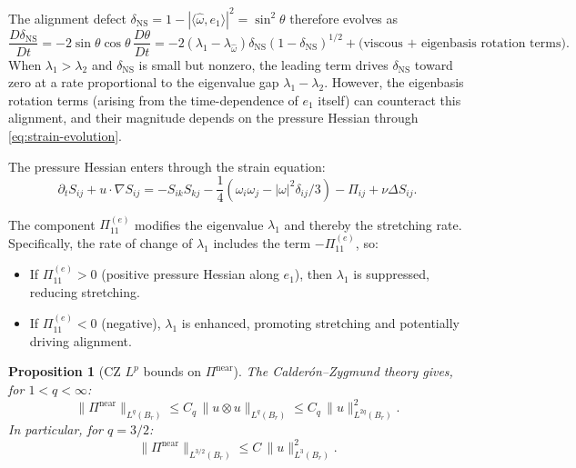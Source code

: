 \documentclass[11pt]{article}
\newtheorem{proposition}[theorem]{Proposition}
\theoremstyle{definition}
\theoremstyle{remark}
\begin{document}
The alignment defect $\delta_{\mathrm{NS}} = 1 - |\langle\hat\omega, e_1\rangle|^2
= \sin^2\theta$ therefore evolves as
\begin{equation}\label{eq:defect-evolution}
  \frac{D\delta_{\mathrm{NS}}}{Dt}
  = -2\sin\theta\cos\theta\,\frac{D\theta}{Dt}
  = -2(\lambda_1 - \lambda_{\hat\omega})\delta_{\mathrm{NS}}(1-\delta_{\mathrm{NS}})^{1/2}
  + \text{(viscous + eigenbasis rotation terms)}.
\end{equation}
When $\lambda_1 > \lambda_2$ and $\delta_{\mathrm{NS}}$ is small but nonzero, the
leading term drives $\delta_{\mathrm{NS}}$ toward zero at a rate proportional to
the eigenvalue gap $\lambda_1 - \lambda_2$.  However, the eigenbasis rotation terms
(arising from the time-dependence of $e_1$ itself) can counteract this alignment,
and their magnitude depends on the pressure Hessian through \eqref{eq:strain-evolution}.

The pressure Hessian enters through the strain equation:
\begin{equation}\label{eq:strain-evolution}
  \partial_t S_{ij} + u\cdot\nabla S_{ij}
  = -S_{ik}S_{kj} - \frac{1}{4}(\omega_i\omega_j - |\omega|^2\delta_{ij}/3)
  - \Pi_{ij} + \nu\Delta S_{ij}.
\end{equation}

The component $\Pi_{11}^{(e)}$ modifies the eigenvalue $\lambda_1$ and thereby the
stretching rate.  Specifically, the rate of change of $\lambda_1$ includes the term
$-\Pi_{11}^{(e)}$, so:
\begin{itemize}[nosep]
  \item If $\Pi_{11}^{(e)} > 0$ (positive pressure Hessian along $e_1$), then
    $\lambda_1$ is suppressed, reducing stretching.
  \item If $\Pi_{11}^{(e)} < 0$ (negative), $\lambda_1$ is enhanced, promoting
    stretching and potentially driving alignment.
\end{itemize}

\begin{proposition}[CZ $L^p$ bounds on $\Pi^{\mathrm{near}}$]
\label{prop:CZ-Lp}
The Calder\'on--Zygmund theory gives, for $1 < q < \infty$:
\begin{equation}\label{eq:CZ-Lp}
  \|\Pi^{\mathrm{near}}\|_{L^q(B_r)} \leq C_q\, \|u\otimes u\|_{L^q(B_r)}
  \leq C_q\, \|u\|_{L^{2q}(B_r)}^2.
\end{equation}
In particular, for $q = 3/2$:
\begin{equation}\label{eq:CZ-3/2}
  \|\Pi^{\mathrm{near}}\|_{L^{3/2}(B_r)} \leq C\, \|u\|_{L^3(B_r)}^2.
\end{equation}
\end{proposition}
\end{document}
